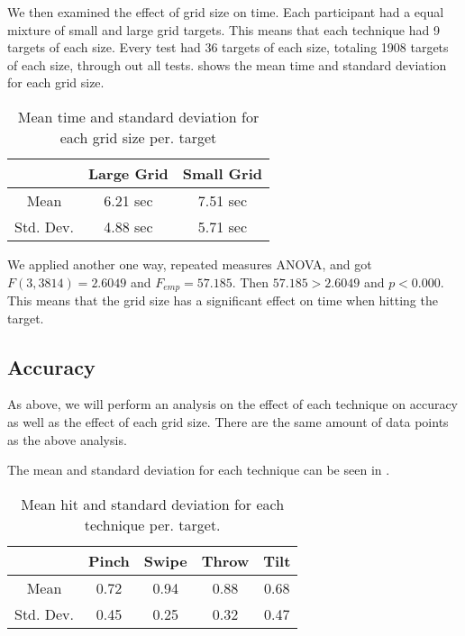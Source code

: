 We then examined the effect of grid size on time. Each participant had a equal mixture of small and large grid targets. This means that each technique had 9 targets of each size. Every test had 36 targets of each size, totaling 1908 targets of each size, through out all tests.  shows the mean time and standard deviation for each grid size. 

\begin{table}[H]
	\centering
	\begin{tabular}{|c|c|c|}
		\hline
		\rowcolor[HTML]{9B9B9B} 
		 & \textbf{Large Grid} & \textbf{Small Grid} \\ \hline
		Mean & 6.21 sec & 7.51 sec \\ \hline
		Std. Dev. & 4.88 sec & 5.71 sec \\ \hline
	\end{tabular}
	\caption{Mean time and standard deviation for each grid size per. target}
	\label{tab:meanTimesSize}
\end{table}

We applied another one way, repeated measures ANOVA, and got $F(3,3814)=2.6049$ and $F_{emp}=57.185$. Then $57.185 > 2.6049$ and $p<0.000$. This means that the grid size has a significant effect on time when hitting the target. 

\subsection{Accuracy}

As above, we will perform an analysis on the effect of each technique on accuracy as well as the effect of each grid size. There are the same amount of data points as the above analysis. 

The mean and standard deviation for each technique can be seen in . 

\begin{table}[H]
	\centering
	\begin{tabular}{|c|c|c|c|c|}
			\hline
			\rowcolor[HTML]{9B9B9B} 
			& \textbf{Pinch} & \textbf{Swipe} & \textbf{Throw} & \textbf{Tilt} \\ \hline
			Mean & 0.72         & 0.94          & 0.88          & 0.68         \\ \hline
			Std. Dev. & 0.45 & 0.25 & 0.32 & 0.47 \\ \hline
	\end{tabular}
	\caption{Mean hit  and standard deviation for each technique per. target.}
	\label{tab:meanHitTechnique}
\end{table}

